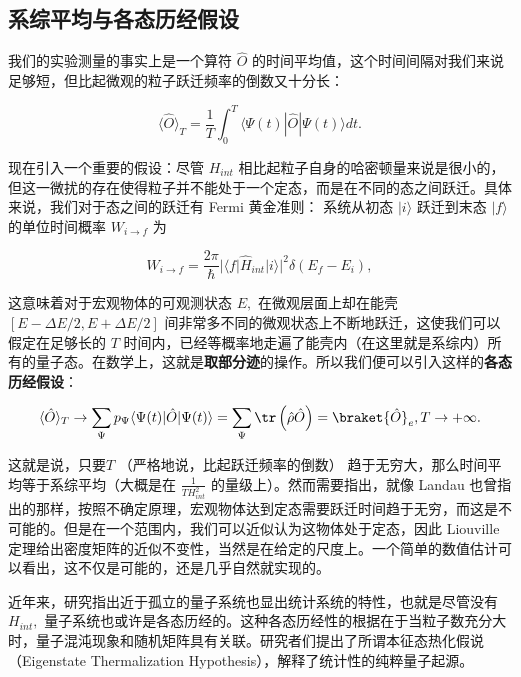 \subsection{系综平均与各态历经假设}
我们的实验测量的事实上是一个算符 $\hat{O}$ 的时间平均值，这个时间间隔对我们来说足够短，但比起微观的粒子跃迁频率的倒数又十分长：
\begin{linenomath}\begin{equation}
\langle \hat{O} \rangle_T = \frac{1}{T} \int_0^T \langle \Psi(t) | \hat{O} | \Psi(t) \rangle dt.
\end{equation}\end{linenomath}
现在引入一个重要的假设：尽管 $H_{int}$ 相比起粒子自身的哈密顿量来说是很小的，但这一微扰的存在使得粒子并不能处于一个定态，而是在不同的态之间跃迁。具体来说，我们对于态之间的跃迁有 Fermi 黄金准则：
系统从初态 $|i\rangle$ 跃迁到末态 $|f\rangle$ 的单位时间概率 $W_{i \to f}$ 为
\begin{linenomath}\begin{equation}W_{i \to f} = \frac{2\pi}{\hbar} |\langle f | \hat{H}_{int} | i \rangle|^2 \delta(E_f - E_i),\end{equation}\end{linenomath}
这意味着对于宏观物体的可观测状态 $E,$ 在微观层面上却在能壳 $[E-\Delta E/2,E+\Delta E/2]$ 间非常多不同的微观状态上不断地跃迁，这使我们可以假定在足够长的 $T$ 时间内，已经等概率地走遍了能壳内（在这里就是系综内）所有的量子态。在数学上，这就是\textbf{取部分迹}的操作。所以我们便可以引入这样的\textbf{各态历经假设}：
\begin{linenomath}\begin{equation}
\langle \hat{O} \rangle_T \to \sum_{\Psi} p_\Psi \langle \Psi(t) | \hat{O} | \Psi(t) \rangle = \sum_{\Psi}\tr\left( \hat\rho\hat O \right) = \braket{\hat O}_e, T\to+\infty.
\end{equation}\end{linenomath}
这就是说，只要$T$ （严格地说，比起跃迁频率的倒数） 趋于无穷大，那么时间平均等于系综平均（大概是在 $\frac{1}{TH_{int}^2}$ 的量级上）。然而需要指出，就像 Landau 也曾指出的那样，按照不确定原理，宏观物体达到定态需要跃迁时间趋于无穷，而这是不可能的。但是在一个范围内，我们可以近似认为这物体处于定态，因此 Liouville 定理给出密度矩阵的近似不变性，当然是在给定的尺度上。一个简单的数值估计可以看出，这不仅是可能的，还是几乎自然就实现的。

近年来，研究指出近于孤立的量子系统也显出统计系统的特性，也就是尽管没有 $H_{int},$ 量子系统也或许是各态历经的。这种各态历经性的根据在于当粒子数充分大时，量子混沌现象和随机矩阵具有关联。研究者们提出了所谓本征态热化假说（Eigenstate Thermalization Hypothesis），解释了统计性的纯粹量子起源。
\label{time}

